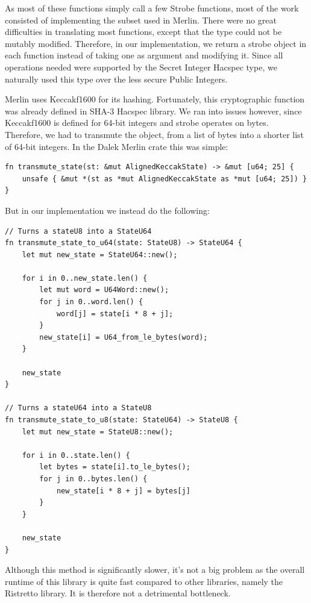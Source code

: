 \documentclass{article}
\newcommand*\ttvar[1]{\texttt{\expandafter\dottvar\detokenize{#1}\relax}}
\newcommand*\dottvar[1]{\ifx\relax#1\else
  \expandafter\ifx\string_#1\string_\allowbreak\else#1\fi
  \expandafter\dottvar\fi}
\begin{document}
As most of these functions simply call a few Strobe functions, most
of the work consisted of implementing the \ttvar{strobe} subset
used in Merlin. There were no great difficulties in translating most
functions, except that the \ttvar{Strobe} type could not be mutably
modified. Therefore, in our implementation, we return a strobe object in
each function instead of taking one as argument and modifying it. Since
all operations needed were supported by the Secret Integer Hacspec type,
we naturally used this type over the less secure Public Integers.

Merlin uses Keccakf1600 for its hashing. Fortunately, this cryptographic
function was already defined in SHA-3 Hacspec library. We ran into
issues however, since Keccakf1600 is defined for 64-bit integers
and strobe operates on bytes. Therefore, we had to transmute the
\ttvar{State} object, from a list of bytes into a shorter list of
64-bit integers. In the Dalek Merlin crate this was simple:

\begin{lstlisting}
fn transmute_state(st: &mut AlignedKeccakState) -> &mut [u64; 25] {
	unsafe { &mut *(st as *mut AlignedKeccakState as *mut [u64; 25]) }
}
\end{lstlisting}

But in our implementation we instead do the following: 

\begin{lstlisting}
// Turns a stateU8 into a StateU64
fn transmute_state_to_u64(state: StateU8) -> StateU64 {
	let mut new_state = StateU64::new();

	for i in 0..new_state.len() {
		let mut word = U64Word::new();
		for j in 0..word.len() {
			word[j] = state[i * 8 + j];
		}
		new_state[i] = U64_from_le_bytes(word);
	}

	new_state
}

// Turns a stateU64 into a StateU8
fn transmute_state_to_u8(state: StateU64) -> StateU8 {
	let mut new_state = StateU8::new();

	for i in 0..state.len() {
		let bytes = state[i].to_le_bytes();
		for j in 0..bytes.len() {
			new_state[i * 8 + j] = bytes[j]
		}
	}

	new_state
}
\end{lstlisting}

Although this method is significantly slower, it's not a big problem
as the overall runtime of this library is quite fast compared to other
libraries, namely the Ristretto library. It is therefore not a 
detrimental bottleneck.
\end{document}
